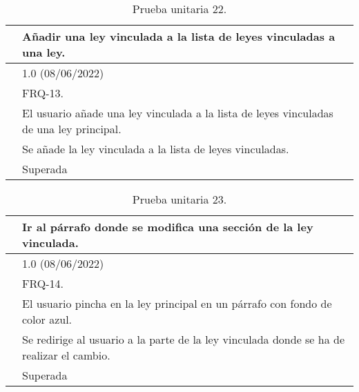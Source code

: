 \begin{table}[H]
\begin{center}
\begin{tabular}{|p{3cm}|p{10cm}|} \hline
\centering {\bf PU-22} & Añadir una ley vinculada a la lista de leyes vinculadas a una ley.  \\ \hline\hline
\centering {\bf Versión} & 1.0 (08/06/2022) \\ \hline
\centering {\bf Dependencias} & FRQ-13. \\ \hline
\centering {\bf Descripción} &  El usuario añade una ley vinculada a la lista de leyes vinculadas de una ley principal. \\ \hline
\centering {\bf Criterio de aceptación} & Se añade la ley vinculada a la lista de leyes vinculadas. \\ \hline
\centering {\bf Estado} & Superada \\ \hline
\end{tabular}
\caption{Prueba unitaria 22.}
\label{enlacePU22}
\end{center}
\end{table}

\begin{table}[H]
\begin{center}
\begin{tabular}{|p{3cm}|p{10cm}|} \hline
\centering {\bf PU-23} & Ir al párrafo donde se modifica una sección de la ley vinculada.  \\ \hline\hline
\centering {\bf Versión} & 1.0 (08/06/2022) \\ \hline
\centering {\bf Dependencias} & FRQ-14. \\ \hline
\centering {\bf Descripción} &  El usuario pincha en la ley principal en un párrafo con fondo de color azul. \\ \hline
\centering {\bf Criterio de aceptación} & Se redirige al usuario a la parte de la ley vinculada donde se ha de realizar el cambio. \\ \hline
\centering {\bf Estado} & Superada \\ \hline
\end{tabular}
\caption{Prueba unitaria 23.}
\label{enlacePU23}
\end{center}
\end{table}

